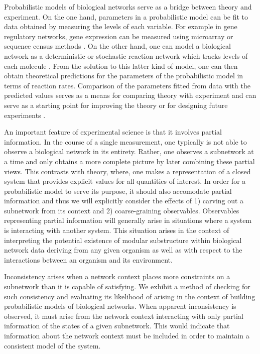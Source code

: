 Probabilistic models of biological networks serve as a bridge between theory and experiment.  On the one hand, parameters in a probabilistic model can be fit to data obtained by measuring the levels of each variable. For example in gene regulatory networks, gene expression can be measured using microarray or sequence census methods \cite{Friedman2008a,Zhang2013}.  On the other hand, one can model a biological network as a deterministic or stochastic reaction network which tracks levels of each molecule \cite{Alon2006,Voit2012}.  From the solution to this latter kind of model, one can then obtain theoretical predictions for the parameters of the probabilistic model in terms of reaction rates.  Comparison of the parameters fitted from data with the predicted values serves as a means for comparing theory with experiment and can serve as a starting point for improving the theory or for designing future experiments \cite{Tonsing2014}.

An important feature of experimental science is that it involves partial information.  In the course of a single measurement, one typically is not able to observe a biological network in its entirety.  Rather, one observes a subnetwork at a time and only obtains a more complete picture by later combining these partial views.  This contrasts with theory, where, one makes a representation of a closed system that provides explicit values for all quantities of interest.  In order for a probabilistic model to serve its purpose, it should also accomodate partial information and thus we will explicitly consider the effects of 1) carving out a subnetwork from its context and 2) coarse-graining observables. Observables representing partial information will generally arise in situations where a system is interacting with another system. This situation arises in the context of interpreting the potential existence of modular substructure within biological network data deriving from any given organism as well as with respect to the interactions between an organism and its environment.


Inconsistency arises when a network context places more constraints on a subnetwork than it is capable of satisfying. We exhibit a method of checking for such consistency and evaluating its likelihood of arising in the context of building probabilistic models of biological networks. When apparent inconsistency is observed, it must arise from the network context interacting with only partial information of the states of a given subnetwork. This would indicate that information about the network context must be included in order to maintain a consistent model of the system.

